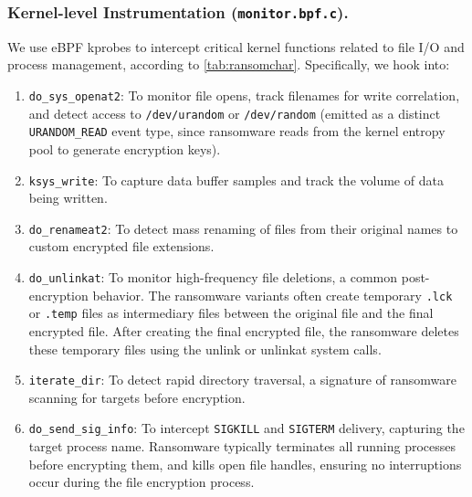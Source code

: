 \documentclass[twocolumn, 10pt]{scrartcl}
\begin{document}
\subsubsection{Kernel-level Instrumentation (\texttt{monitor.bpf.c}).}
We use eBPF kprobes to intercept critical kernel functions related to file I/O 
and process management, according to \cref{tab:ransomchar}. Specifically, we hook into:
\begin{enumerate}
    \item \texttt{do\_sys\_openat2}: To monitor file opens, track filenames for write correlation, and detect access to \texttt{/dev/urandom} or \texttt{/dev/random} (emitted as a distinct \texttt{URANDOM\_READ} event type, since ransomware reads from the kernel entropy pool to generate encryption keys).
    \item \texttt{ksys\_write}: To capture data buffer samples and track the volume of data being written.
    \item \texttt{do\_renameat2}: To detect mass renaming of files from their original names to custom encrypted file extensions.
    \item \texttt{do\_unlinkat}: To monitor high-frequency file deletions, a common post-encryption behavior. The ransomware variants often create temporary \texttt{.lck} or \texttt{.temp} files as intermediary files between the original file and the final encrypted file. After creating the final encrypted file, the ransomware deletes these temporary files using the unlink or unlinkat system calls.
    \item \texttt{iterate\_dir}: To detect rapid directory traversal, a signature of ransomware scanning for targets before encryption.
    \item \texttt{do\_send\_sig\_info}: To intercept \texttt{SIGKILL} and \texttt{SIGTERM} delivery, capturing the target process name. Ransomware typically terminates all running processes before encrypting them, and kills open file handles, ensuring no interruptions occur during the file encryption process.
\end{enumerate}
\end{document}
